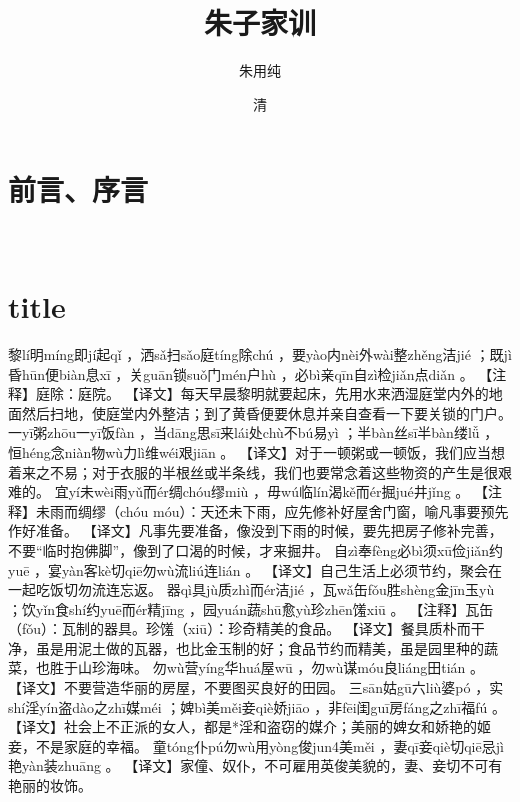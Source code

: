 \documentclass[12pt,UTF8]{ctexbook}
\title{\heiti\zihao{0} 朱子家训}
\author{朱用纯}
\date{清}
\begin{document}
\maketitle
\tableofcontents

\frontmatter
\chapter{前言、序言}

\mainmatter

~\\

 \qquad  

\chapter{title}
黎lí明míng即jí起qǐ
，洒sǎ扫sǎo庭tíng除chú
，要yào内nèi外wài整zhěng洁jié
；既jì昏hūn便biàn息xī
，关guān锁suǒ门mén户hù
，必bì亲qīn自zì检jiǎn点diǎn
。
【注释】庭除：庭院。
【译文】每天早晨黎明就要起床，先用水来洒湿庭堂内外的地面然后扫地，使庭堂内外整洁；到了黄昏便要休息并亲自查看一下要关锁的门户。
一yī粥zhōu一yī饭fàn
，当dāng思sī来lái处chù不bú易yì
；半bàn丝sī半bàn缕lǚ
，恒héng念niàn物wù力lì维wéi艰jiān
。
【译文】对于一顿粥或一顿饭，我们应当想着来之不易；对于衣服的半根丝或半条线，我们也要常念着这些物资的产生是很艰难的。
宜yí未wèi雨yǔ而ér绸chóu缪miù
，毋wú临lín渴kě而ér掘jué井jǐng
。
【注释】未雨而绸缪（chóu móu）：天还未下雨，应先修补好屋舍门窗，喻凡事要预先作好准备。
【译文】凡事先要准备，像没到下雨的时候，要先把房子修补完善，不要“临时抱佛脚”，像到了口渴的时候，才来掘井。
自zì奉fèng必bì须xū俭jiǎn约yuē
，宴yàn客kè切qiē勿wù流liú连lián
。
【译文】自己生活上必须节约，聚会在一起吃饭切勿流连忘返。
器qì具jù质zhì而ér洁jié
，瓦wǎ缶fǒu胜shèng金jīn玉yù
；饮yǐn食shí约yuē而ér精jīng
，园yuán蔬shū愈yù珍zhēn馐xiū
。
【注释】瓦缶（fǒu）：瓦制的器具。珍馐（xiū）：珍奇精美的食品。
【译文】餐具质朴而干净，虽是用泥土做的瓦器，也比金玉制的好；食品节约而精美，虽是园里种的蔬菜，也胜于山珍海味。
勿wù营yíng华huá屋wū
，勿wù谋móu良liáng田tián
。
【译文】不要营造华丽的房屋，不要图买良好的田园。
三sān姑gū六liù婆pó
，实shí淫yín盗dào之zhī媒méi
；婢bì美měi妾qiè娇jiāo
，非fēi闺guī房fáng之zhī福fú
。
【译文】社会上不正派的女人，都是*淫和盗窃的媒介；美丽的婢女和娇艳的姬妾，不是家庭的幸福。
童tóng仆pú勿wù用yòng俊jun4美měi
，妻qī妾qiè切qiē忌jì艳yàn装zhuāng
。
【译文】家僮、奴仆，不可雇用英俊美貌的，妻、妾切不可有艳丽的妆饰。
\end{document}
